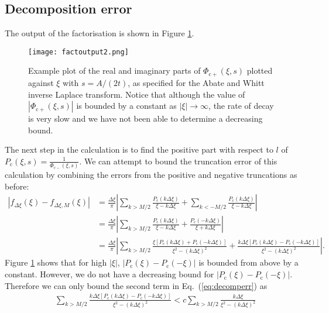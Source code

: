 \documentclass[11pt,a4paper]{article}
\begin{document}
\subsection{Decomposition error}\label{sec:errperf_decomp}

The output of the factorisation is shown in Figure \ref{fig:factoutput}.
\begin{figure}
\begin{center}
\texttt{[image: factoutput2.png]}
\caption{Example plot of the real and imaginary parts of $\Phi_{\mathrm{c}+}(\xi,s)$ plotted against $\xi$ with $s = A/(2t)$, as specified for the Abate and Whitt inverse Laplace transform. Notice that although the value of $|\Phi_{\mathrm{c}+}(\xi,s)|$ is bounded by a constant as $|\xi|\rightarrow\infty$, the rate of decay is very slow and we have not been able to determine a decreasing bound.}
\label{fig:factoutput}
\end{center}
\end{figure}
The next step in the calculation is to find the positive part with respect to $l$ of $P_{\mathrm{c}}(\xi,s)=\frac{1}{\Phi_{\mathrm{c-}}(\xi,s)}$. We can attempt to bound the truncation error of this calculation by combining the errors from the positive and negative truncations as before:
\begin{align}
\left|f_{\Delta\xi}(\xi)-f_{\Delta\xi,M}(\xi)\right| &=\frac{\Delta\xi}{\pi}\left|\sum_{k>M/2}\frac{P_{\mathrm{c}}(k\Delta\xi)}{\xi-k\Delta\xi}+\sum_{k<-M/2}\frac{P_{\mathrm{c}}(k\Delta\xi)}{\xi-k\Delta\xi}\right|\nonumber\\
& = \frac{\Delta\xi}{\pi}\left|\sum_{k>M/2}\frac{P_{\mathrm{c}}(k\Delta\xi)}{\xi-k\Delta\xi}+\frac{P_{\mathrm{c}}(-k\Delta\xi)}{\xi+k\Delta\xi}\right|\nonumber\\
& = \frac{\Delta\xi}{\pi}\left|\sum_{k>M/2}\frac{\xi[P_{\mathrm{c}}(k\Delta\xi)+P_{\mathrm{c}}(-k\Delta\xi)]}{\xi^2-(k\Delta\xi)^2}+\frac{k\Delta\xi[P_{\mathrm{c}}(k\Delta\xi)-P_{\mathrm{c}}(-k\Delta\xi)]}{\xi^2-(k\Delta\xi)^2}\right|.\label{eq:decomperr}
\end{align}
Figure \ref{fig:factoutput} shows that for high $|\xi|$, $|P_{\mathrm{c}}(\xi)-P_{\mathrm{c}}(-\xi)|$ is bounded from above by a constant. However, we do not have a decreasing bound for $|P_{\mathrm{c}}(\xi)-P_{\mathrm{c}}(-\xi)|$. Therefore we can only bound the second term in Eq.~(\ref{eq:decomperr}) as
\begin{align}
\label{}
&\sum_{k>M/2} \frac{k\Delta\xi[P_{\mathrm{c}}(k\Delta\xi)-P_{\mathrm{c}}(-k\Delta\xi)]}{\xi^2-(k\Delta\xi)^2}< c\sum_{k>M/2} \frac{k\Delta\xi}{\xi^2-(k\Delta\xi)^2}\label{eq:decomperr2}
\end{align}
\end{document}
